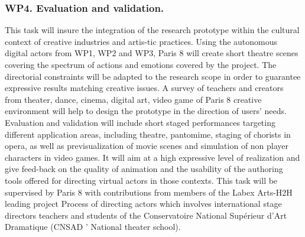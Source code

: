 
\subsubsection{WP4. Evaluation and validation.  }

This task will insure the integration of the research prototype within the cultural context of creative industries and artis-tic practices. Using the autonomous digital actors from WP1, WP2 and WP3, Paris 8 will create short theatre scenes covering the spectrum of actions and emotions covered by the project. The directorial constraints will be adapted to the research scope in order to guarantee expressive results matching creative issues. A survey of teachers and creators from theater, dance, cinema, digital art, video game of Paris 8 creative environment will help to design the prototype in the direction of users' needs. Evaluation and validation will include short staged performances targeting different application areas, including theatre, pantomime, staging of chorists in opera, as well as previsualization of movie scenes and simulation of non player characters in video games. It will aim at a high expressive level of realization and give feed-back on the quality of animation and the usability of the 
authoring tools offered for directing virtual actors in those contexts. This task will be supervised by Paris 8 with contributions from members of the Labex Arts-H2H leading project Process of directing actors  which involves international stage directors teachers and students of the Conservatoire National Sup\'erieur d'Art Dramatique (CNSAD ' National theater school).

\endinput
